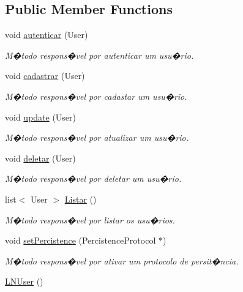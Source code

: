 \subsection*{Public Member Functions}
\begin{DoxyCompactItemize}
\item 
void \hyperlink{class_l_n_user_a74c91c7a9e6d8ceaf8ebfed027178221}{autenticar} (User)
\begin{DoxyCompactList}\small\item\em M�todo respons�vel por autenticar um usu�rio. \end{DoxyCompactList}\item 
void \hyperlink{class_l_n_user_a4702a50096c617aa7a9ea9b25fda3063}{cadastrar} (User)
\begin{DoxyCompactList}\small\item\em M�todo respons�vel por cadastar um usu�rio. \end{DoxyCompactList}\item 
void \hyperlink{class_l_n_user_a4093083f84eec431151c7315b5064b88}{update} (User)
\begin{DoxyCompactList}\small\item\em M�todo respons�vel por atualizar um usu�rio. \end{DoxyCompactList}\item 
void \hyperlink{class_l_n_user_ac2058724d8d0b2ab8da440b9acc2b80a}{deletar} (User)
\begin{DoxyCompactList}\small\item\em M�todo respons�vel por deletar um usu�rio. \end{DoxyCompactList}\item 
\hypertarget{class_l_n_user_a49a8cb98850d1812aa504fd7ec1c64f0}{list$<$ User $>$ \hyperlink{class_l_n_user_a49a8cb98850d1812aa504fd7ec1c64f0}{Listar} ()}\label{class_l_n_user_a49a8cb98850d1812aa504fd7ec1c64f0}

\begin{DoxyCompactList}\small\item\em M�todo respons�vel por listar os usu�rios. \end{DoxyCompactList}\item 
void \hyperlink{class_l_n_user_aadeddd422a7e5b1b7059b472dcee1631}{set\-Percistence} (Percistence\-Protocol $\ast$)
\begin{DoxyCompactList}\small\item\em M�todo respons�vel por ativar um protocolo de persit�ncia. \end{DoxyCompactList}\item 
\hypertarget{class_l_n_user_aacf199ac94fc28825e3692aa097fe842}{\hyperlink{class_l_n_user_aacf199ac94fc28825e3692aa097fe842}{L\-N\-User} ()}\label{class_l_n_user_aacf199ac94fc28825e3692aa097fe842}


\end{DoxyCompactItemize}
